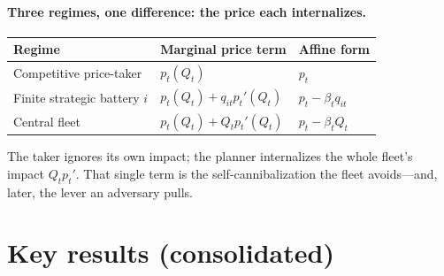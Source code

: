 \documentclass[11pt]{article}
\begin{document}
\paragraph{Three regimes, one difference: the price each internalizes.}
\begin{center}
\begin{tabular}{@{}lll@{}}
\toprule
Regime & Marginal price term & Affine form\\
\midrule
Competitive price-taker & $p_t(Q_t)$ & $p_t$\\
Finite strategic battery $i$ & $p_t(Q_t)+q_{it}p_t'(Q_t)$ & $p_t-\beta_t q_{it}$\\
Central fleet & $p_t(Q_t)+Q_t p_t'(Q_t)$ & $p_t-\beta_t Q_t$\\
\bottomrule
\end{tabular}
\end{center}
The taker ignores its own impact; the planner internalizes the whole fleet's
impact $Q_t p_t'$. That single term is the self-cannibalization the fleet
avoids---and, later, the lever an adversary pulls.

\section{Key results (consolidated)}
\end{document}
